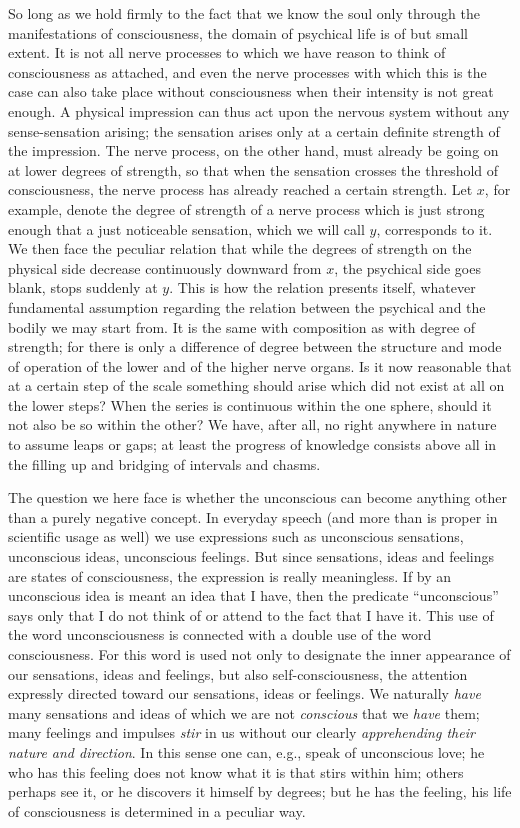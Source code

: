 \documentclass[12pt,a4paper]{book}
\newcommand{\opage}[1]{\marginnote{\footnotesize\textit{[#1]}}}
\begin{document}
So long as we hold firmly to the fact that we know the soul only through
the manifestations of consciousness, the domain of psychical life is of
but small extent. It is not all nerve processes to which we have reason
to think of consciousness as attached, and even the nerve processes with
which this is the case can also take place without consciousness when
their intensity is not great enough. A physical impression can thus act
upon the nervous system without any sense-sensation arising; the
sensation arises only at a certain definite strength of the impression.
The nerve process, on the other hand, must already be going on at lower
degrees of strength, so that when the sensation crosses the threshold of
consciousness, the nerve process has already reached a certain strength.
Let $x$, for example, denote the degree of strength of a nerve process
which is just strong enough that a just noticeable sensation, which we
will call $y$, corresponds to it. We then face the peculiar relation
that while the degrees of strength on the physical side decrease
continuously downward from $x$, the psychical side goes blank, stops
suddenly at $y$. This is how the relation presents itself, whatever
fundamental assumption regarding the relation
\opage{86}between the psychical and the bodily we may start from. It is
the same with composition as with degree of strength; for there is only a
difference of degree between the structure and mode of operation of the
lower and of the higher nerve organs. Is it now reasonable that at a
certain step of the scale something should arise which did not exist at
all on the lower steps? When the series is continuous within the one
sphere, should it not also be so within the other? We have, after all,
no right anywhere in nature to assume leaps or gaps; at least the
progress of knowledge consists above all in the filling up and bridging
of intervals and chasms.

The question we here face is whether the unconscious can become anything
other than a purely negative concept. In everyday speech (and more than
is proper in scientific usage as well) we use expressions such as
unconscious sensations, unconscious ideas, unconscious feelings. But since
sensations, ideas and feelings are states of consciousness, the
expression is really meaningless. If by an unconscious idea is meant an
idea that I have, then the predicate ``unconscious'' says only that I do
not think of or attend to the fact that I have it. This use of the word
unconsciousness is connected with a double use of the word
consciousness. For this word is used not only to designate the inner
appearance of our sensations, ideas and feelings, but also
self-consciousness, the attention expressly directed toward our
sensations, ideas or feelings. We naturally \emph{have} many sensations
and ideas of which we are not \emph{conscious} that we \emph{have} them;
many feelings and impulses \emph{stir} in us without our clearly
\emph{apprehending their nature and direction}. In this sense one can,
e.g., speak of unconscious love; he who has this feeling does not know
what it is that stirs within him; others perhaps see it, or he discovers
it himself by degrees; but he has the feeling, his life of consciousness
is determined in a peculiar way.
\end{document}
